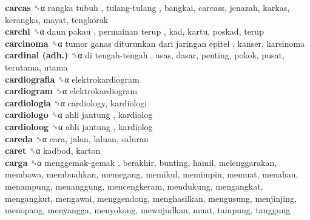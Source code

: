 \textbf{carcas} ␝α   rangka tubuh ,  tulang-tulang , bangkai, carcass, jenazah, karkas, kerangka, mayat, tengkorak  \\
\textbf{carchi} ␝α   daun pakau ,  permainan terup , kad, kartu, poskad, terup  \\
\textbf{carcinoma} ␝α   tumor ganas diturunkan dari jaringan epitel , kanser, karsinoma  \\
\textbf{cardinal (adh.)} ␝α   di tengah-tengah , asas, dasar, penting, pokok, pusat, terutama, utama  \\
\textbf{cardiografia} ␝α  elektrokardiogram  \\
\textbf{cardiogram} ␝α  elektrokardiogram  \\
\textbf{cardiologia} ␝α  cardiology, kardiologi  \\
\textbf{cardiologo} ␝α   ahli jantung , kardiolog  \\
\textbf{cardioloog} ␝α   ahli jantung , kardiolog  \\
\textbf{careda} ␝α  cara, jalan, laluan, saluran  \\
\textbf{caret} ␝α  kadbod, karton  \\
\textbf{carga} ␝α   menggemak-gemak , berakhir, bunting, hamil, melenggarakan, membawa, membuahkan, memegang, memikul, memimpin, memuat, menahan, menampung, menanggung, mencengkeram, mendukung, mengangkat, mengangkut, mengawai, menggendong, menghasilkan, mengusung, menjinjing, menopang, menyangga, menyokong, mewujudkan, muat, tampung, tanggung  \\
